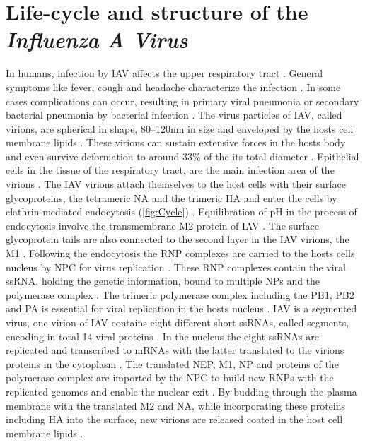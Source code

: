 \section{Life-cycle and structure of the \textit{Influenza A Virus}}

In humans, infection by \gls{IAV} affects the upper respiratory tract \autocite{julkunen_inflammatory_2000}. General symptoms like fever, cough and headache characterize the infection \autocite{julkunen_inflammatory_2000}. In some cases complications can occur, resulting in primary viral pneumonia or secondary bacterial pneumonia by bacterial infection \autocite{julkunen_inflammatory_2000}. The virus particles of \gls{IAV}, called virions, are spherical in shape, 80–120nm in size and enveloped by the hosts cell membrane lipids \autocite{oxford_chapter_1987, mudhakir_learning_2009, cann_chapter_2016}. These virions can sustain extensive forces in the hosts body and even survive deformation to around 33\% of the its total diameter \autocite{schaap_effect_2012}. Epithelial cells in the tissue of the respiratory tract, are the main infection area of the virions \autocite{oxford_chapter_1987}. The \gls{IAV} virions attach themselves to the host cells with their surface glycoproteins, the tetrameric \gls{NA} and the trimeric \gls{HA} and enter the cells by clathrin-mediated endocytosis (\autoref{fig:Cycle}) \autocite{jones_global_2008, mudhakir_learning_2009, wilson_structure_1981, varghese_structure_1983}. Equilibration of pH in the process of endocytosis involve the transmembrane \gls{M2} protein of \gls{IAV} \autocite{pielak_influenza_2011}. The surface glycoprotein tails are also connected to the second layer in the \gls{IAV} virions, the \gls{M1} \autocite{ali_influenza_2000}. Following the endocytosis the \gls{RNP} complexes are carried to the hosts cells nucleus by \gls{NPC} for virus replication \autocite{eisfeld_at_2015}. These \gls{RNP} complexes contain the viral \gls{ssRNA}, holding the genetic information, bound to multiple \glspl{NP} and the polymerase complex \autocite{eisfeld_at_2015}. The trimeric polymerase complex including the \gls{PB1}, \gls{PB2} and \gls{PA} is essential for viral replication in the hosts nucleus \autocite{area_3d_2004, eisfeld_at_2015}. \gls{IAV} is a segmented virus, one virion of \gls{IAV} contains eight different short \glspl{ssRNA}, called segments, encoding in total 14 viral proteins \autocite{eisfeld_at_2015}. In the nucleus the eight \glspl{ssRNA} are replicated and transcribed to \glspl{mRNA} with the latter translated to the virions proteins in the cytoplasm \autocite{eisfeld_at_2015}. The translated \gls{NEP}, \gls{M1}, \gls{NP} and proteins of the polymerase complex are imported by the \gls{NPC} to build new \glspl{RNP} with the replicated genomes and enable the nuclear exit \autocite{eisfeld_at_2015}. By budding through the plasma membrane with the translated \gls{M2} and \gls{NA}, while incorporating these proteins including \gls{HA} into the surface, new virions are released coated in the host cell membrane lipids \autocite{eisfeld_at_2015}.


